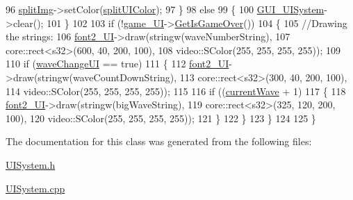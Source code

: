 \begin{DoxyCode}
96         \hyperlink{_u_i_system_8cpp_a5953c52bb91b4ee31776cbf91260ccc6}{splitImg}->setColor(\hyperlink{_u_i_system_8cpp_ac142a7d664627b15adf335194b223699}{splitUIColor});
97     \}
98     \textcolor{keywordflow}{else} 
99     \{
100         \hyperlink{_u_i_system_8cpp_a0cd3595b157fa82f333e52a18cd05671}{GUI\_UISystem}->clear();
101     \}
102 
103     \textcolor{keywordflow}{if} (!\hyperlink{_u_i_system_8cpp_abae6af8ee586e9cd14e611834ab165aa}{game\_UI}->\hyperlink{class_game_a472e76af50d5275142522f9a5e149ab1}{GetIsGameOver}())
104     \{
105         \textcolor{comment}{//Drawing the strings:}
106         \hyperlink{_u_i_system_8cpp_ada6b9907ce29ba6326347751450d127c}{font2\_UI}->draw(stringw(waveNumberString),
107             core::rect<s32>(600, 40, 200, 100),
108             video::SColor(255, 255, 255, 255));
109 
110         \textcolor{keywordflow}{if} (\hyperlink{_enemy_spawner_8cpp_a30a29af809eac59191fdd00041d88039}{waveChangeUI} == \textcolor{keyword}{true})
111         \{
112             \hyperlink{_u_i_system_8cpp_ada6b9907ce29ba6326347751450d127c}{font2\_UI}->draw(stringw(waveCountDownString),
113                 core::rect<s32>(300, 40, 200, 100),
114                 video::SColor(255, 255, 255, 255));
115 
116             \textcolor{keywordflow}{if} ((\hyperlink{_enemy_spawner_8cpp_ae8875f134fe6fadbb9f14c149ef06d50}{currentWave} + 1) %
117             \{
118                 \hyperlink{_u_i_system_8cpp_ada6b9907ce29ba6326347751450d127c}{font2\_UI}->draw(stringw(bigWaveString),
119                     core::rect<s32>(325, 120, 200, 100),
120                     video::SColor(255, 255, 255, 255));
121             \}
122         \}
123     \}
124 
125 \}
\end{DoxyCode}


The documentation for this class was generated from the following files\-:\begin{DoxyCompactItemize}
\item 
\hyperlink{_u_i_system_8h}{U\-I\-System.\-h}\item 
\hyperlink{_u_i_system_8cpp}{U\-I\-System.\-cpp}\end{DoxyCompactItemize}
